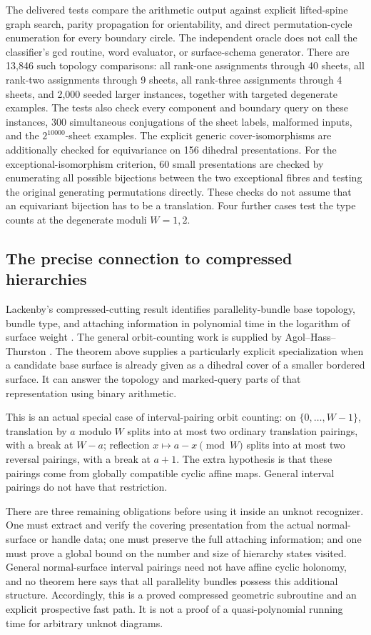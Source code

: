 The delivered tests compare the arithmetic output against explicit
lifted-spine graph search, parity propagation for orientability, and
direct permutation-cycle enumeration for every boundary circle.  The
independent oracle does not call the classifier's gcd routine, word
evaluator, or surface-schema generator.  There are 13,846 such topology
comparisons: all rank-one assignments through 40 sheets, all rank-two
assignments through 9 sheets, all rank-three assignments through 4
sheets, and 2,000 seeded larger instances, together with targeted
degenerate examples.  The tests also check every component and boundary
query on these instances, 300 simultaneous conjugations of the sheet
labels, malformed inputs, and the $2^{10000}$-sheet examples.
The explicit generic cover-isomorphisms are additionally checked for
equivariance on 156 dihedral presentations.
For the exceptional-isomorphism criterion, 60 small presentations are
checked by enumerating all possible bijections between the two
exceptional fibres and testing the original generating permutations
directly.  These checks do not assume that an equivariant bijection
has to be a translation.  Four further cases test the type counts at
the degenerate moduli $W=1,2$.

\subsection{The precise connection to compressed hierarchies}

Lackenby's compressed-cutting result identifies parallelity-bundle base
topology, bundle type, and attaching information in polynomial time in
the logarithm of surface weight \cite[Theorem~14.4]{Lackenby2026}.
The general orbit-counting work is supplied by
Agol--Hass--Thurston \cite{AHT2006}.  The theorem above supplies a
particularly explicit specialization when a candidate base surface is
already given as a dihedral cover of a smaller bordered surface.
It can answer the topology and marked-query parts of that representation
using binary arithmetic.

This is an actual special case of interval-pairing orbit counting:
on $\{0,\ldots,W-1\}$, translation by $a$ modulo $W$ splits into at
most two ordinary translation pairings, with a break at $W-a$;
reflection $x\mapsto a-x\pmod W$ splits into at most two reversal
pairings, with a break at $a+1$.  The extra hypothesis is that these
pairings come from globally compatible cyclic affine maps.  General
interval pairings do not have that restriction.

There are three remaining obligations before using it inside an unknot
recognizer.  One must extract and verify the covering presentation from
the actual normal-surface or handle data; one must preserve the full
attaching information; and one must prove a global bound on the number
and size of hierarchy states visited.  General normal-surface interval
pairings need not have affine cyclic holonomy, and no theorem here says
that all parallelity bundles possess this additional structure.
Accordingly, this is a proved compressed geometric subroutine and an
explicit prospective fast path.  It is not a proof of a
quasi-polynomial running time for arbitrary unknot diagrams.

